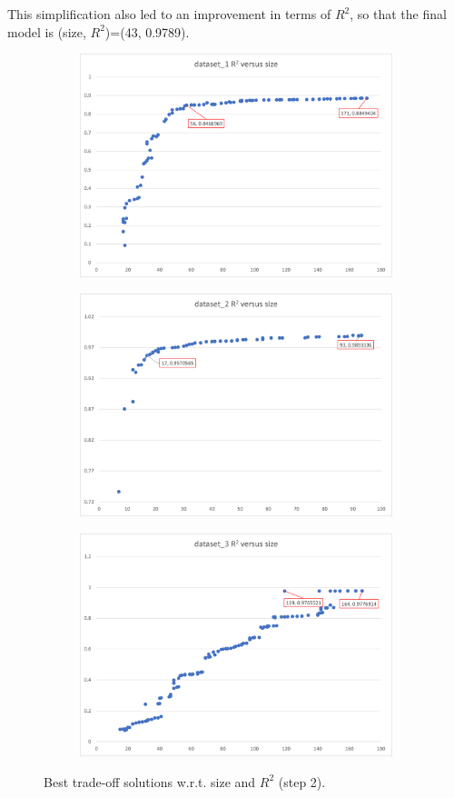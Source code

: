 \documentclass{article}
\begin{document}
This simplification also led to an improvement in terms of $R^2$, so that the final model is (size, $R^2$)=(43, 0.9789).

\begin{figure}[ht]
\begin{subfigure}{.5\textwidth}
  \centering
  \includegraphics[width=0.95\linewidth]{solutions1.png}
  \label{fig:sfig1}
\end{subfigure}%
\begin{subfigure}{.5\textwidth}
  \centering
  \includegraphics[width=0.95\linewidth]{solutions2.png}
  \label{fig:sfig2}
  
\end{subfigure}
\begin{subfigure}{1\textwidth}
  \centering
  \includegraphics[width=0.5\linewidth]{solutions3.png}
  \label{fig:sfig3}
\end{subfigure}
\caption{Best trade-off solutions w.r.t. size and $R^2$ (step 2).}
\label{fig:fig_tradeoff}
\end{figure}



 
\end{document}
